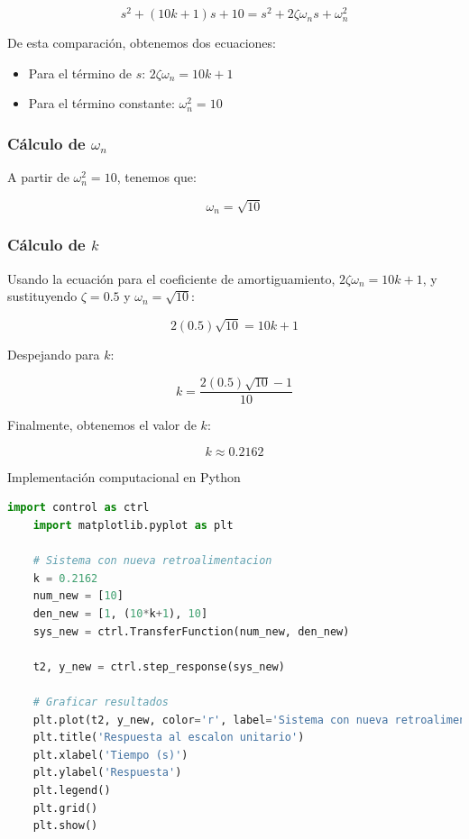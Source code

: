 \documentclass[10pt]{article}
\theoremstyle{definition}
\theoremstyle{remark}
\theoremstyle{definition}
\numberwithin{equation}{prob}
\begin{document}
\[
s^2 + (10k + 1)s + 10 = s^2 + 2\zeta \omega_n s + \omega_n^2
\]

De esta comparación, obtenemos dos ecuaciones:

\begin{itemize}
    \item Para el término de \( s \): \( 2\zeta \omega_n = 10k + 1 \)
    \item Para el término constante: \( \omega_n^2 = 10 \)
\end{itemize}

\subsubsection{Cálculo de \texorpdfstring{\( \omega_n \)}{omega\_n}}

A partir de \( \omega_n^2 = 10 \), tenemos que:

\[
\omega_n = \sqrt{10}
\]

\subsubsection{Cálculo de \texorpdfstring{\( k \)}{k}}

Usando la ecuación para el coeficiente de amortiguamiento, \( 2\zeta \omega_n = 10k + 1 \), y sustituyendo \( \zeta = 0.5 \) y \( \omega_n = \sqrt{10} \):

\[
2(0.5)\sqrt{10} = 10k + 1
\]

Despejando para \( k \):

\[
k = \frac{2(0.5)\sqrt{10} - 1}{10}
\]

Finalmente, obtenemos el valor de \( k \):

\[
k \approx 0.2162
\]

Implementación computacional en Python
\begin{lstlisting}[language=Python]
	import control as ctrl
	import matplotlib.pyplot as plt

	# Sistema con nueva retroalimentacion
	k = 0.2162
	num_new = [10]
	den_new = [1, (10*k+1), 10]
	sys_new = ctrl.TransferFunction(num_new, den_new)

	t2, y_new = ctrl.step_response(sys_new)

	# Graficar resultados
	plt.plot(t2, y_new, color='r', label='Sistema con nueva retroalimentacion')
	plt.title('Respuesta al escalon unitario')
	plt.xlabel('Tiempo (s)')
	plt.ylabel('Respuesta')
	plt.legend()
	plt.grid()
	plt.show()
\end{lstlisting}
\end{document}
